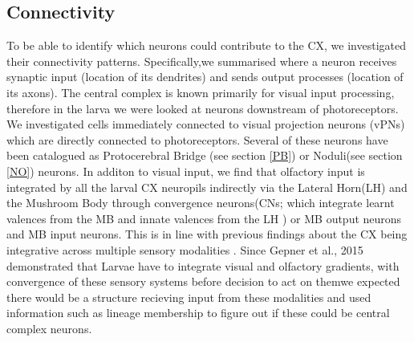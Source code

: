\subsection{Connectivity}
To be able to identify which neurons could contribute to the CX, we investigated their connectivity patterns. Specifically,we summarised where a neuron receives synaptic input (location of its dendrites) and sends output processes (location of its axons).
The central complex is known primarily for visual input processing, therefore in the larva we were looked at neurons downstream of photoreceptors. We investigated cells immediately connected to visual projection neurons (vPNs) which are directly connected to photoreceptors. Several of these neurons have been catalogued as Protocerebral Bridge (see section \ref{PB}) or Noduli(see section \ref{NO}) neurons. 
In additon to visual input, we find that olfactory input is integrated by all the larval CX neuropils indirectly via the Lateral Horn(LH) and the Mushroom Body through convergence neurons(CNs; which integrate learnt valences from the MB and innate valences from the LH \citep{eschbach2021circuits}) or MB output neurons and MB input neurons. This is in line with previous findings about the CX being integrative across multiple sensory modalities \citep{hulse2021connectome}. Since Gepner et al., 2015 demonstrated that Larvae  have to integrate visual and olfactory gradients, with convergence of these sensory systems before decision to act on themwe expected there would be a structure recieving input from these modalities and used information such as lineage membership to figure out if these could be central complex neurons. 


